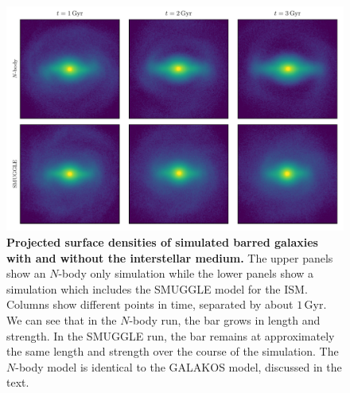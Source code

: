 \documentclass{natureprintstyle}
\newcommand{\Nbody}{$N$-body}
\begin{document}
\begin{figure}[h!]%
\centering
\includegraphics[width=18cm]{fig/fig1.pdf}
\caption{\textbf{Projected surface densities of simulated barred galaxies with
and without the interstellar medium.} The upper panels show an \Nbody{} only
simulation while the lower panels show a simulation which includes the SMUGGLE
model for the ISM. Columns show different points in time, separated by about
$1\,\textrm{Gyr}$. We can see that in the \Nbody{} run, the bar grows in
length and strength. In the SMUGGLE run, the bar remains at approximately the
same length and strength over the course of the simulation. The \Nbody{} model
is identical to the GALAKOS model, discussed in the text.}\label{fig:overview}
\end{figure}
\end{document}
